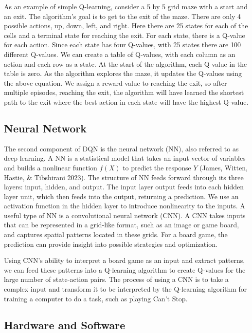 \documentclass[12pt]{article}
\begin{document}
\begin{thesis}
As an example of simple Q-learning, consider a 5 by 5 grid maze with a start and an exit.
The algorithm's goal is to get to the exit of the maze.
There are only 4 possible actions, up, down, left, and right.
Here there are 25 states for each of the cells and a terminal state for reaching the exit.
For each state, there is a Q-value for each action.
Since each state has four Q-values, with 25 states there are 100 different Q-values.
We can create a table of Q-values, with each column as an action and each row as a state.
At the start of the algorithm, each Q-value in the table is zero.
As the algorithm explores the maze, it updates the Q-values using the above equation.
We assign a reward value to reaching the exit, so after multiple episodes, reaching the exit, the algorithm will have learned the shortest path to the exit where the best action in each state will have the highest Q-value.

\subsection{Neural Network}\label{neural-network}

The second component of DQN is the neural network (NN), also referred to as deep learning.
A NN is a statistical model that takes an input vector of variables and builds a nonlinear function \(f(X)\) to predict the response \(Y\) (James, Witten, Hastie, \& Tibshirani 2023).
The structure of NN feeds forward through its three layers: input, hidden, and output.
The input layer output feeds into each hidden layer unit, which then feeds into the output, returning a prediction.
We use an activation function in the hidden layer to introduce nonlinearity to the inputs.
A useful type of NN is a convolutional neural network (CNN).
A CNN takes inputs that can be represented in a grid-like format, such as an image or game board, and captures spatial patterns located in these grids.
For a board game, the prediction can provide insight into possible strategies and optimization.

Using CNN's ability to interpret a board game as an input and extract patterns, we can feed these patterns into a Q-learning algorithm to create Q-values for the large number of state-action pairs.
The process of using a CNN is to take a complex input and transform it to be interpreted by the Q-learning algorithm for training a computer to do a task, such as playing Can't Stop.

\subsection{Hardware and Software}\label{hardware-and-software}


\end{thesis}
\end{document}

